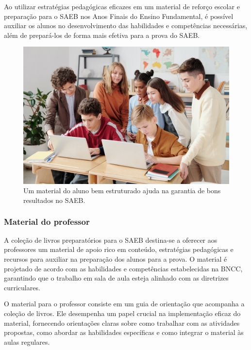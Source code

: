 Ao utilizar estratégias pedagógicas eficazes em um material de reforço
escolar e preparação para o SAEB nos Anos Finais do Ensino
Fundamental, é possível auxiliar os alunos no desenvolvimento das
habilidades e competências necessárias, além de prepará-los de forma
mais efetiva para a prova do SAEB.

\begin{figure}
\centering
\includegraphics[width=\textwidth]{./imgs/Imagem009.jpg}
\caption{Um material do aluno bem estruturado ajuda na garantia de bons
resultados no SAEB.}
\end{figure}

\subsubsection{Material do professor}\label{material-do-professor}

A coleção de livros preparatórios para o SAEB destina-se a oferecer aos
professores um material de apoio rico em conteúdo, estratégias
pedagógicas e recursos para auxiliar na preparação dos alunos para a
prova. O material é projetado de acordo com as habilidades e
competências estabelecidas na BNCC, garantindo que o trabalho em sala de
aula esteja alinhado com as diretrizes curriculares.

O material para o professor consiste em um guia de orientação que
acompanha a coleção de livros. Ele desempenha um papel crucial na
implementação eficaz do material, fornecendo orientações claras sobre
como trabalhar com as atividades propostas, como abordar as habilidades
específicas e como integrar o material às aulas regulares.

